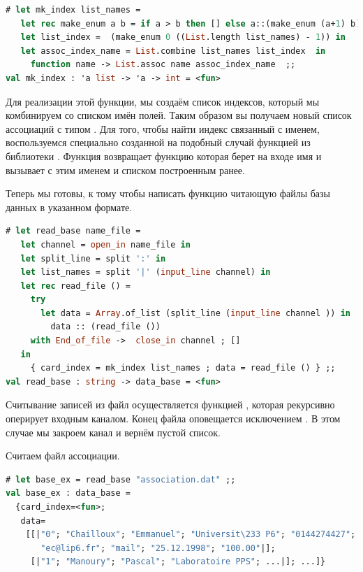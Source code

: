 \begin{lstlisting}[language=OCaml]
# let mk_index list_names = 
   let rec make_enum a b = if a > b then [] else a::(make_enum (a+1) b) in 
   let list_index =  (make_enum 0 ((List.length list_names) - 1)) in 
   let assoc_index_name = List.combine list_names list_index  in 
     function name -> List.assoc name assoc_index_name  ;;
val mk_index : 'a list -> 'a -> int = <fun>
\end{lstlisting}

Для реализации этой функции, мы создаём список индексов, который мы комбинируем 
со списком имён полей. Таким образом вы получаем новый список ассоциаций с 
типом . Для того, чтобы найти индекс связанный с 
именем, воспользуемся специально созданной на подобный случай функцией 
 из библиотеки . Функция  возвращает 
функцию которая берет на входе имя и вызывает  с этим именем и 
списком построенным ранее.

Теперь мы готовы, к тому чтобы написать функцию читающую файлы базы данных в 
указанном формате.

\begin{lstlisting}[language=OCaml]
# let read_base name_file =
   let channel = open_in name_file in
   let split_line = split ':' in
   let list_names = split '|' (input_line channel) in
   let rec read_file () = 
     try 
       let data = Array.of_list (split_line (input_line channel )) in
         data :: (read_file ())
     with End_of_file ->  close_in channel ; []
   in 
     { card_index = mk_index list_names ; data = read_file () } ;;
val read_base : string -> data_base = <fun>
\end{lstlisting}

Считывание записей из файл осуществляется функцией , которая 
рекурсивно оперирует входным каналом. Конец файла оповещается исключением 
. В этом случае мы закроем канал и вернём пустой список.

Считаем файл ассоциации.

\begin{lstlisting}[language=OCaml]
# let base_ex = read_base "association.dat" ;;
val base_ex : data_base =
  {card_index=<fun>;
   data=
    [[|"0"; "Chailloux"; "Emmanuel"; "Universit\233 P6"; "0144274427";
       "ec@lip6.fr"; "mail"; "25.12.1998"; "100.00"|];
     [|"1"; "Manoury"; "Pascal"; "Laboratoire PPS"; ...|]; ...]}
\end{lstlisting}

